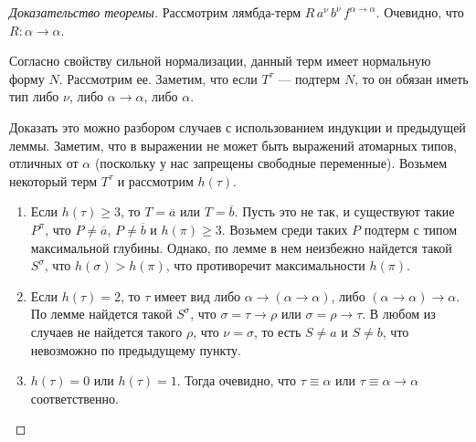 \begin{proof}[Доказательство теоремы]
Рассмотрим лямбда-терм $R \, a^\nu \, b^\nu \, f^{\alpha\rightarrow\alpha}$.
Очевидно, что $R: \alpha\rightarrow\alpha$.

Согласно свойству сильной нормализации, данный терм имеет нормальную форму $N$. 
Рассмотрим ее. Заметим, что если $T^\tau$ --- подтерм $N$, то он обязан иметь тип 
либо $\nu$, либо $\alpha\rightarrow\alpha$, либо $\alpha$.


Доказать это можно разбором случаев с использованием индукции и предыдущей леммы.
Заметим, что в выражении не может быть выражений атомарных типов, отличных от
$\alpha$ (поскольку у нас запрещены свободные переменные).
Возьмем некоторый терм $T^\tau$ и рассмотрим $h(\tau)$.

\begin{enumerate}
\item Если $h(\tau) \ge 3$, то $T=\overline{a}$ или $T=\overline{b}$. 
Пусть это не так, и существуют такие $P^\pi$, что $P\ne \overline{a}$, $P\ne \overline{b}$ и $h(\pi) \ge 3$.
Возьмем среди таких $P$ подтерм с типом максимальной глубины.
Однако, по лемме в нем неизбежно найдется такой $S^\sigma$, что $h(\sigma)>h(\pi)$, 
что противоречит максимальности $h(\pi)$.

\item Если $h(\tau) = 2$, то $\tau$ имеет вид либо $\alpha\rightarrow(\alpha\rightarrow\alpha)$,
либо $(\alpha\rightarrow\alpha)\rightarrow\alpha$. По лемме найдется такой
$S^\sigma$, что $\sigma=\tau\rightarrow\rho$ или $\sigma=\rho\rightarrow\tau$.
В любом из случаев не найдется такого $\rho$, что $\nu = \sigma$, то есть $S\ne a$ и
$S\ne b$, что невозможно по предыдущему пункту.

\item $h(\tau) = 0$ или $h(\tau) = 1$. Тогда очевидно, что
$\tau\equiv\alpha$ или $\tau\equiv\alpha\rightarrow\alpha$ соответственно.
\end{enumerate}


\end{proof}
